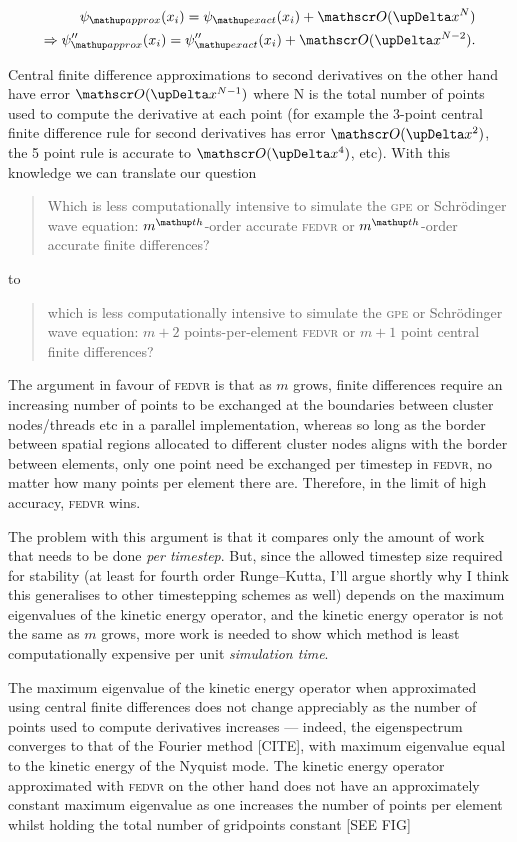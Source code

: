 \begin{align}
\psi_\up{approx}(x_i) = \psi_\up{exact}(x_i) + \Ord{\upDelta x^N}\\
\Rightarrow\psi^{\prime \prime}_\up{approx}(x_i) =  \psi^{\prime\prime}_\up{exact}(x_i) + \Ord{\upDelta x^{N-2}}.
\end{align} 

Central finite difference approximations to second derivatives on the other hand have error $\Ord{\upDelta x^{N - 1}}$ where N is the total number of points used to compute the derivative at each point (for example the 3-point central finite difference rule for second derivatives has error $\Ord{\upDelta x^2}$, the 5 point rule is accurate to $\Ord{\upDelta x^4}$, etc). With this knowledge we can translate our question

\begin{quote}
Which is less computationally intensive to simulate the \textsc{gpe} or Schr\"odinger wave equation: $m^\up{th}$-order accurate \textsc{fedvr} or $m^\up{th}$-order accurate finite differences?
\end{quote}
to
\begin{quote}
which is less computationally intensive to simulate the \textsc{gpe} or Schr\"odinger wave equation: $m+2$ points-per-element \textsc{fedvr} or $m+1$ point central finite differences?
\end{quote}
The argument in favour of \textsc{fedvr} is that as $m$ grows, finite differences require an increasing number of points to be exchanged at the boundaries between cluster nodes/threads etc in a parallel implementation, whereas so long as the border between spatial regions allocated to different cluster nodes aligns with the border between elements, only one point need be exchanged per timestep in \textsc{fedvr}, no matter how many points per element there are. Therefore, in the limit of high accuracy, \textsc{fedvr} wins.

The problem with this argument is that it compares only the amount of work that needs to be done \emph{per timestep}. But, since the allowed timestep size required for stability (at least for fourth order Runge--Kutta, I'll argue shortly why I think this generalises to other timestepping schemes as well) depends on the maximum eigenvalues of the kinetic energy operator, and the kinetic energy operator is not the same as $m$ grows, more work is needed to show which method is least computationally expensive per unit \emph{simulation time}.

The maximum eigenvalue of the kinetic energy operator when approximated using central finite differences does not change appreciably as the number of points used to compute derivatives increases --- indeed, the eigenspectrum converges to that of the Fourier method [CITE], with maximum eigenvalue equal to the kinetic energy of the Nyquist mode. The kinetic energy operator approximated with \textsc{fedvr} on the other hand does not have an approximately constant maximum eigenvalue as one increases the number of points per element whilst holding the total number of gridpoints constant [SEE FIG]



